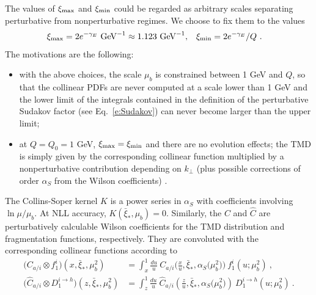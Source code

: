 \documentclass[aps,preprintnumbers,showpacs,nofootinbib,superscriptaddress,floatfix]{revtex4}
\newcommand{\AS}[1]{{\textcolor[rgb]{1,0,1}{#1}}}
\newcommand{\T}{\perp}
\newcommand{\bb}{\xi}
\begin{document}
The values of $\bb_{\rm max}$ and
$\bb_{\rm min}$ could
be regarded as arbitrary scales separating perturbative from nonperturbative
regimes. 
We choose to fix them to the
values 
\begin{align}
\bb_{\rm max} &= 2 e^{-\gamma_E}  \text{  GeV}^{-1} \approx 1.123 \text{  GeV}^{-1}, 
&
\bb_{\rm min} &= 2 e^{-\gamma_E}/Q \ .
\label{e:bminmax}
\end{align} 
The motivations are the following: 
\begin{itemize}
\item{} with the above choices, the scale $\mu_b$ is
  constrained between 1 GeV and $Q$, so that the collinear PDFs are never
  computed at a scale lower than 1 GeV and the lower limit of the integrals
  contained in the definition of the perturbative Sudakov factor (see
  Eq.~\eqref{e:Sudakov})  can never
  become larger than the upper limit;
\item{} at $Q=Q_0 = 1$ GeV, $\bb_{\rm max} = \bb_{\rm min}$ and there are no evolution effects; the TMD is
simply given by the corresponding collinear function multiplied by a
nonperturbative contribution depending on $k_\T$ (plus possible corrections of
order $\alpha_S$ from the Wilson coefficients) .
\end{itemize} 

The Collins-Soper kernel $K$ is a power series in $\alpha_S$ with coefficients
involving $\ln \mu/\mu_b$. 
At NLL accuracy, $K(\bar{\bb}_{\ast},\mu_b) =
0$. 
Similarly, the $C$ and $\hat{C}$ are perturbatively calculable Wilson
coefficients for 
the TMD distribution and fragmentation functions, respectively. They are
convoluted with the corresponding collinear functions according to 
\begin{align}
\bigl( C_{a/i} \otimes f_1^i \bigr) (x, \bar{\bb}_\ast, \mu_b^2) &=
  \int_x^1 \frac{du}{u}\  
        C_{a/i} \Big( \frac{x}{u}, \bar{\bb}_\ast, \alpha_S\big(\mu_b^2\big)  \Big) \  
        f_1^i (u; \mu_b^2) \  , 
\label{e:WC1} \\
\bigl( \hat{C}_{a/i} \otimes D_1^{i\to h} \bigr) (z, \bar{\bb}_\ast, \mu_b^2) &= \int_z^1 \frac{du}{u}\  \hat{C}_{a/i} \left( \frac{z}{u}, \bar{\bb}_\ast, \alpha_S\big(\mu_b^2\big) \right) \  D_1^{i\to h} (u; \mu_b^2) \  . 
\label{e:WC2}
\end{align}
\end{document}

